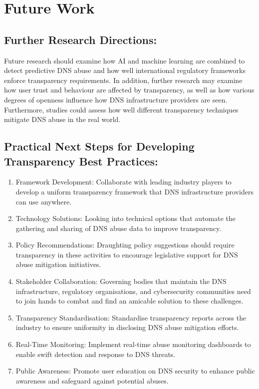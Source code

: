 \section{Future Work}



\subsection{Further Research Directions:} Future research should examine how AI and machine learning are combined to detect predictive DNS abuse and how well international regulatory frameworks enforce transparency requirements. In addition, further research may examine how user trust and behaviour are affected by transparency, as well as how various degrees of openness influence how DNS infrastructure providers are seen. Furthermore, studies could assess how well different transparency techniques mitigate DNS abuse in the real world.

\subsection{Practical Next Steps for Developing Transparency Best Practices: }

\begin{enumerate}
    \item Framework Development: Collaborate with leading industry players to develop a uniform transparency framework that DNS infrastructure providers can use anywhere.

    \item Technology Solutions: Looking into technical options that automate the gathering and sharing of DNS abuse data to improve transparency.

    \item Policy Recommendations: Draughting policy suggestions should require transparency in these activities to encourage legislative support for DNS abuse mitigation initiatives.
    
    \item Stakeholder Collaboration: Governing bodies that maintain the DNS infrastructure, regulatory organisations, and cybersecurity communities need to join hands to combat and find an amicable solution to these challenges.
    
    \item Transparency Standardisation: Standardise transparency reports across the industry to ensure uniformity in disclosing DNS abuse mitigation efforts.
    \item Real-Time Monitoring: Implement real-time abuse monitoring dashboards to enable swift detection and response to DNS threats.
    \item  Public Awareness: Promote user education on DNS security to enhance public awareness and safeguard against potential abuses.
\end{enumerate}


